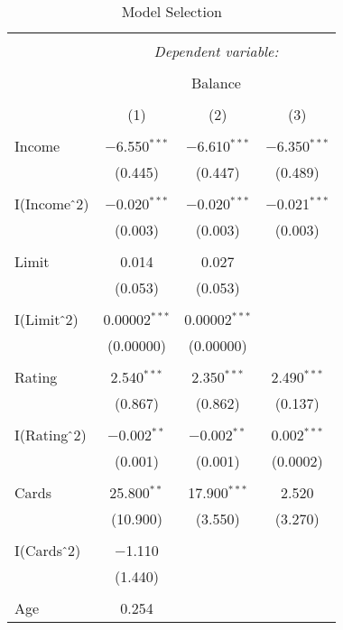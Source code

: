 \documentclass[11pt]{article}
\begin{document}
\begin{table}[!htbp] \centering 
  \caption{Model Selection} 
  \label{} 
\begin{tabular}{@{\extracolsep{5pt}}lccc} 
\\[-1.8ex]\hline 
\hline \\[-1.8ex] 
 & \multicolumn{3}{c}{\textit{Dependent variable:}} \\ 
\cline{2-4} 
\\[-1.8ex] & \multicolumn{3}{c}{Balance} \\ 
\\[-1.8ex] & (1) & (2) & (3)\\ 
\hline \\[-1.8ex] 
 Income & $-$6.550$^{***}$ & $-$6.610$^{***}$ & $-$6.350$^{***}$ \\ 
  & (0.445) & (0.447) & (0.489) \\ 
  & & & \\ 
 I(Income$\hat{\mkern6mu}$2) & $-$0.020$^{***}$ & $-$0.020$^{***}$ & $-$0.021$^{***}$ \\ 
  & (0.003) & (0.003) & (0.003) \\ 
  & & & \\ 
 Limit & 0.014 & 0.027 &  \\ 
  & (0.053) & (0.053) &  \\ 
  & & & \\ 
 I(Limit$\hat{\mkern6mu}$2) & 0.00002$^{***}$ & 0.00002$^{***}$ &  \\ 
  & (0.00000) & (0.00000) &  \\ 
  & & & \\ 
 Rating & 2.540$^{***}$ & 2.350$^{***}$ & 2.490$^{***}$ \\ 
  & (0.867) & (0.862) & (0.137) \\ 
  & & & \\ 
 I(Rating$\hat{\mkern6mu}$2) & $-$0.002$^{**}$ & $-$0.002$^{**}$ & 0.002$^{***}$ \\ 
  & (0.001) & (0.001) & (0.0002) \\ 
  & & & \\ 
 Cards & 25.800$^{**}$ & 17.900$^{***}$ & 2.520 \\ 
  & (10.900) & (3.550) & (3.270) \\ 
  & & & \\ 
 I(Cards$\hat{\mkern6mu}$2) & $-$1.110 &  &  \\ 
  & (1.440) &  &  \\ 
  & & & \\ 
 Age & 0.254 &  &  \\ 

\end{tabular}
\end{table}
\end{document}
